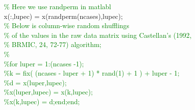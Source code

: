 \hspace{1mm}\indent \indent \indent \indent \indent \indent \indent \indent \indent \indent \indent \indent \textcolor{green}{\% Here we use randperm in matlabl }\\ 
\hspace{1mm}\indent \indent \indent \indent \indent \indent \indent \indent \indent \indent \indent \indent x(:,lupec) = x(randperm(ncases),lupec); \\ 
\hspace{1mm}\indent \indent \indent \indent \indent \indent \indent \indent \indent \indent \indent \indent \textcolor{green}{\% Below is column-wise random shufflings }\\ 
\hspace{1mm}\indent \indent \indent \indent \indent \indent \indent \indent \indent \indent \indent \indent \textcolor{green}{\%  of the values in the raw data matrix using Castellan's (1992,  }\\ 
\hspace{1mm}\indent \indent \indent \indent \indent \indent \indent \indent \indent \indent \indent \indent \textcolor{green}{\%  BRMIC, 24, 72-77) algorithm; }\\ 
\hspace{1mm}\indent \indent \indent \indent \indent \indent \indent \indent \indent \indent \indent \indent \textcolor{green}{\% }\\ 
\hspace{1mm}\indent \indent \indent \indent \indent \indent \indent \indent \indent \indent \indent \indent \textcolor{green}{\%for luper = 1:(ncases -1); }\\ 
\hspace{1mm}\indent \indent \indent \indent \indent \indent \indent \indent \indent \indent \indent \indent \textcolor{green}{\%k = fix( (ncases - luper + 1) * rand(1) + 1 )  + luper - 1; }\\ 
\hspace{1mm}\indent \indent \indent \indent \indent \indent \indent \indent \indent \indent \indent \indent \textcolor{green}{\%d = x(luper,lupec); }\\ 
\hspace{1mm}\indent \indent \indent \indent \indent \indent \indent \indent \indent \indent \indent \indent \textcolor{green}{\%x(luper,lupec) = x(k,lupec); }\\ 
\hspace{1mm}\indent \indent \indent \indent \indent \indent \indent \indent \indent \indent \indent \indent \textcolor{green}{\%x(k,lupec) = d;end;end; }\\ 
